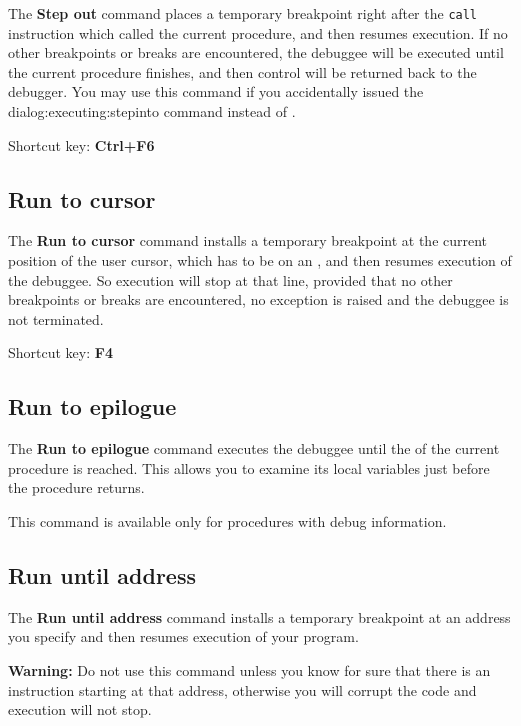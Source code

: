 The {\bf Step out} command places a temporary breakpoint right after
the \verb'call' instruction which called the current procedure, and then
resumes execution. If no other breakpoints or breaks are encountered,
the debuggee will be executed until the current procedure finishes,
and then control will be returned back to the debugger. You may use
this command if you accidentally issued the 
{dialog:executing:stepinto} command instead of
.

Shortcut key: {\bf Ctrl+F6}

\subsection{Run to cursor}
\label{dialog:executing:tocursor}

The {\bf Run to cursor} command installs a temporary breakpoint at
the current position of the user cursor, which has to be on an
,
and then resumes execution of the debuggee.
So execution will stop at that line, provided that no other breakpoints
or breaks are encountered, no exception is raised and the debuggee
is not terminated.

Shortcut key: {\bf F4}

\subsection{Run to epilogue}
\label{dialog:executing:toepilogue}

The {\bf Run to epilogue} command executes the debuggee until
the  of the current procedure is reached.
This allows you to examine its local variables just before the procedure returns.

This command is available only for procedures with debug information.

\subsection{Run until address}
\label{dialog:executing:address}

The {\bf Run until address} command installs a temporary breakpoint
at an address you specify and then resumes execution of your
program.

{\bf Warning:} Do not use this command unless you know for sure
that there is an instruction starting at that address,
otherwise you will corrupt the code and execution will not stop.

